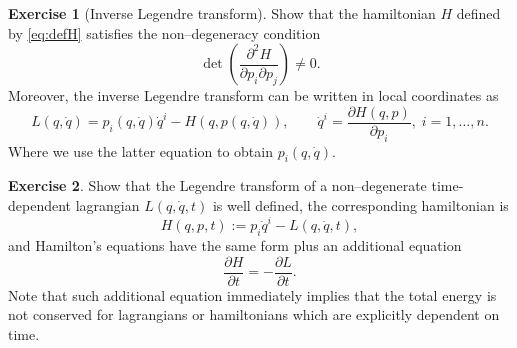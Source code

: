 \documentclass[english,fontsize=11pt,paper=b5]{scrbook}
\numberwithin{equation}{chapter}
\theoremstyle{definition}
\newtheorem{exercise}{Exercise}[chapter]
\begin{document}
    \begin{exercise}[Inverse Legendre transform]
      Show that the hamiltonian $H$ defined by \eqref{eq:defH} satisfies the non--degeneracy condition
      \begin{equation}
        \det\left(\frac{\partial^2 H}{\partial p_i\partial p_j}\right) \neq 0.
      \end{equation}
      Moreover, the inverse Legendre transform can be written in local coordinates as
      \begin{equation}\label{eq:inverseLegendre}
        L(q, \dot q) = p_i(q, \dot q) \dot q^i - H(q, p(q,\dot q)),\qquad
        \dot q^i = \frac{\partial H (q,p)}{\partial p_i}, \; i=1,\ldots,n.
      \end{equation}
      Where we use the latter equation to obtain $p_i(q, \dot q)$.
    \end{exercise}

    \begin{exercise}\label{exe:timedep}
      Show that the Legendre transform of a non--degenerate time-dependent lagrangian $L(q,\dot q, t)$ is well defined, the corresponding hamiltonian is
      \begin{equation}
        H(q,p,t) := p_i \dot q^i - L(q, \dot q, t),
      \end{equation}
      and Hamilton's equations have the same form plus an additional equation
      \begin{equation}
        \frac{\partial H}{\partial t} = - \frac{\partial L}{\partial t}.
      \end{equation}
      Note that such additional equation immediately implies that the total energy is not conserved for lagrangians or hamiltonians which are explicitly dependent on time.
    \end{exercise}
\end{document}
